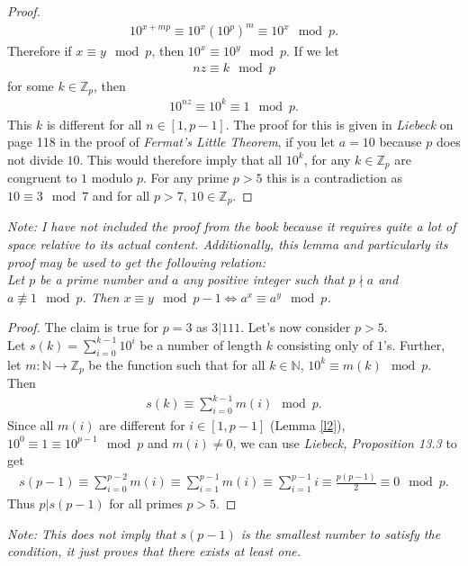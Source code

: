 \documentclass{article}
\newcommand{\N}{\mathbb{N}}
\newcommand{\Z}{\mathbb{Z}}
\begin{document}
\begin{adjustwidth}{2em}{2em}
\begin{proof}
\begin{align*}
      10^{x+mp}\equiv 10^{x}\left(10^{p}\right)^m\equiv 10^{x}\mod p.
    \end{align*}    
    Therefore if $x\equiv y \mod p$, then $10^x\equiv 10^y\mod p$. If we let
    \begin{align*}
      nz \equiv k \mod p
    \end{align*}
    for some $k\in\Z_p$, then
    \begin{align*}
      10^{nz}\equiv 10^{k} \equiv 1 \mod p.
    \end{align*}
   This $k$ is different for all $n\in[1,p-1]$. The proof for this is given in \emph{Liebeck} on page 118 in the proof of \emph{Fermat's Little Theorem}, if you let $a=10$ because $p$ does not divide $10$. This would therefore imply that all $10^k$, for any $k\in\Z_p$ are congruent to $1$ modulo $p$. For any prime $p>5$ this is a contradiction as $10\equiv 3 \mod 7$ and for all $p>7$, $10\in\Z_p$.
  \end{proof}
  \emph{Note: I have not included the proof from the book because it requires quite a lot of space relative to its actual content. 
  Additionally, this lemma and particularly its proof may be used to get the following relation:\\
  Let $p$ be a prime number and $a$ any positive integer such that $p\nmid a$ and $a\not\equiv 1 \mod p$. Then $x\equiv y \mod p-1 \Leftrightarrow a^x\equiv a^y \mod p$.}
\end{adjustwidth}
\begin{proof}
  The claim is true for $p=3$ as $3|111$. Let's now consider $p>5$.\\
  Let $s(k)=\sum_{i=0}^{k-1} 10^i$ be a number of length $k$ consisting only of $1$'s.
  Further, let $m:\N\to\Z_p$ be the function such that for all $k\in\N$, $10^k\equiv m(k)\mod p$. Then
  \begin{align*}
    s(k) \equiv \sum_{i=0}^{k-1} m(i) \mod p.
  \end{align*}
  Since all $m(i)$ are different for $i\in[1,p-1]$ (Lemma \ref{l2}), $10^0\equiv 1\equiv 10^{p-1}\mod p$ and $m(i)\not=0$, we can use \emph{Liebeck, Proposition 13.3} to get
  \begin{align*}
    s(p-1)
    \equiv \sum_{i=0}^{p-2}m(i)
    \equiv \sum_{i=1}^{p-1}m(i)
    \equiv \sum_{i=1}^{p-1} i 
    \equiv \frac{p(p-1)}{2}
    \equiv 0 \mod p.
  \end{align*}
  Thus $p|s(p-1)$ for all primes $p>5$.
\end{proof}
\emph{Note: This does not imply that $s(p-1)$ is the smallest number to satisfy the condition, it just proves that there exists at least one.}
\end{document}
